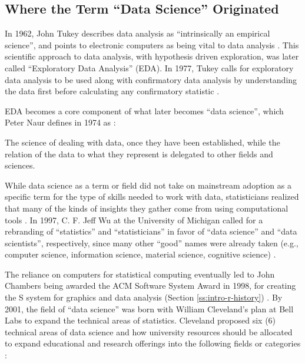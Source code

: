 \documentclass[010-intro.tex]{subfiles}
\begin{document}
\subsection{Where the Term ``Data Science'' Originated}

    In 1962, John Tukey describes data analysis as ``intrinsically an empirical science'',
    and points to electronic computers as being vital to data analysis
    \cite{tukeyFutureDataAnalysis1962, pressVeryShortHistory2013}.
    This scientific approach to data analysis,
    with hypothesis driven exploration,
    was later called ``Exploratory Data Analysis'' (EDA).
    In 1977,
    Tukey calls for exploratory data analysis to be used along with confirmatory data analysis
    by understanding the data first before calculating any confirmatory statistic
    \cite{tukeyExploratoryDataAnalysis1977}.
    
    EDA becomes a core component of what later becomes ``data science'',
    which Peter Naur defines in 1974 as \cite{pressVeryShortHistory2013}:
    \begin{displayquote}
        The science of dealing with data,
        once they have been established,
        while the relation of the data to what they represent
        is delegated to other fields and sciences.
    \end{displayquote}
    While data science as a term or field did not take on mainstream adoption as
    a specific term for the type of skills needed to work with data,
    statisticians realized that many of the kinds of insights they gather
    come from using computational tools
    \cite{tukey1965technical, bradstreet1996teaching}.
    In 1997, C. F. Jeff Wu at the University of Michigan called for a rebranding of
    ``statistics'' and ``statisticians'' in favor of
    ``data science'' and ``data scientists'', respectively,
    since many other ``good'' names were already taken
    (e.g., computer science, information science, material science, cognitive science)
    \cite{pressVeryShortHistory2013}.

    The reliance on computers for statistical computing eventually led to
    John Chambers being awarded the ACM Software System Award in 1998,
    for creating the S system for graphics and data analysis
    (Section \ref{ss:intro-r-history})
    \cite{associationforcomputingmachineryACMSoftwareSystem1998}.
    By 2001, the field of ``data science'' was born with
    William Cleveland's plan at Bell Labs to expand the technical areas of statistics.
    Cleveland proposed six (6) technical areas of data science
    and how university resources should be allocated
    to expand educational and research offerings into the following fields or categories
    \cite{clevelandDataScienceAction2001}:
\end{document}
